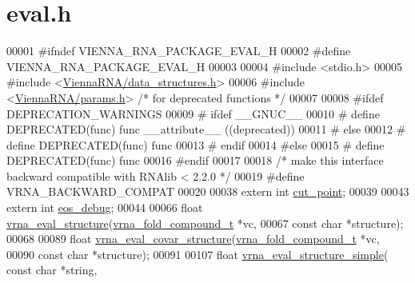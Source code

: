 \hypertarget{eval_8h_source}{}\section{eval.\+h}
\label{eval_8h_source}

\begin{DoxyCode}
00001 \textcolor{preprocessor}{#ifndef VIENNA\_RNA\_PACKAGE\_EVAL\_H}
00002 \textcolor{preprocessor}{#define VIENNA\_RNA\_PACKAGE\_EVAL\_H}
00003 
00004 \textcolor{preprocessor}{#include <stdio.h>}
00005 \textcolor{preprocessor}{#include <\hyperlink{data__structures_8h}{ViennaRNA/data\_structures.h}>}
00006 \textcolor{preprocessor}{#include <\hyperlink{params_8h}{ViennaRNA/params.h}>}   \textcolor{comment}{/* for deprecated functions */}
00007 
00008 \textcolor{preprocessor}{#ifdef DEPRECATION\_WARNINGS}
00009 \textcolor{preprocessor}{# ifdef \_\_GNUC\_\_}
00010 \textcolor{preprocessor}{#  define DEPRECATED(func) func \_\_attribute\_\_ ((deprecated))}
00011 \textcolor{preprocessor}{# else}
00012 \textcolor{preprocessor}{#  define DEPRECATED(func) func}
00013 \textcolor{preprocessor}{# endif}
00014 \textcolor{preprocessor}{#else}
00015 \textcolor{preprocessor}{# define DEPRECATED(func) func}
00016 \textcolor{preprocessor}{#endif}
00017 
00018 \textcolor{comment}{/* make this interface backward compatible with RNAlib < 2.2.0 */}
00019 \textcolor{preprocessor}{#define VRNA\_BACKWARD\_COMPAT}
00020 
00038 \textcolor{keyword}{extern}  \textcolor{keywordtype}{int} \hyperlink{group__eval_gab9b2c3a37a5516614c06d0ab54b97cda}{cut\_point};
00039 
00043 \textcolor{keyword}{extern}  \textcolor{keywordtype}{int} \hyperlink{group__eval_ga567530678f6260a1a649a5beca5da4c5}{eos\_debug};
00044 
00066 \textcolor{keywordtype}{float} \hyperlink{group__eval_ga58f199f1438d794a265f3b27fc8ea631}{vrna\_eval\_structure}(\hyperlink{group__fold__compound_structvrna__fc__s}{vrna\_fold\_compound\_t} *vc,
00067                           \textcolor{keyword}{const} \textcolor{keywordtype}{char} *structure);
00068 
00089 \textcolor{keywordtype}{float} \hyperlink{group__eval_ga6cea75c0eb9857fb59172be54cab09e0}{vrna\_eval\_covar\_structure}(\hyperlink{group__fold__compound_structvrna__fc__s}{vrna\_fold\_compound\_t} *vc,
00090                                 \textcolor{keyword}{const} \textcolor{keywordtype}{char} *structure);
00091 
00107 \textcolor{keywordtype}{float} \hyperlink{group__eval_gab6930f446d04761454d033680fbf7909}{vrna\_eval\_structure\_simple}( \textcolor{keyword}{const} \textcolor{keywordtype}{char} *\textcolor{keywordtype}{string},

\end{DoxyCode}
